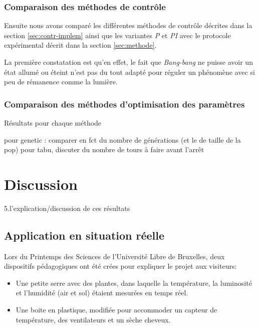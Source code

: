 \documentclass[a4paper,10pt]{report}
\begin{document}
\subsection{Comparaison des méthodes de contrôle}

Ensuite nous avons comparé les différentes méthodes de contrôle décrites dans la section \ref{sec:contr-implem} ainsi que les variantes \textit{P} et \textit{PI} avec le protocole expérimental décrit dans la section \ref{sec:methode}.

La première constatation est qu'en effet, le fait que \textit{Bang-bang} ne puisse avoir un état allumé ou éteint n'est pas du tout adapté pour réguler un phénomène avec si peu de rémanence comme la lumière.

\subsection{Comparaison des méthodes d'optimisation des paramètres}

Résultats pour chaque méthode

pour genetic : comparer en fct du nombre de générations (et le de taille de la pop)
pour tabu, discuter du nombre de tours à faire avant l'arrêt

\chapter{Discussion}
5.l’explication/discussion de ces résultats

\section{Application en situation réelle}


Lors du Printemps des Sciences de l'Université Libre de Bruxelles, deux dispositifs pédagogiques ont été crées pour expliquer le projet aux visiteurs:

\begin{itemize}
\item Une petite serre avec des plantes, dans laquelle la température, la luminosité et l'humidité (air et sol) étaient mesurées en temps réel.
\item Une boite en plastique, modifiée pour accommoder un capteur de température, des ventilateurs et un sèche cheveux.
\end{itemize}
\end{document}
